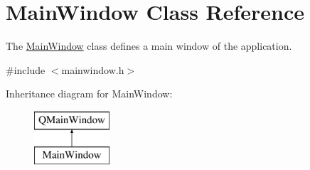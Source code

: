 \hypertarget{class_main_window}{\section{Main\-Window Class Reference}
\label{class_main_window}
}


The \hyperlink{class_main_window}{Main\-Window} class defines a main window of the application.  




{\ttfamily \#include $<$mainwindow.\-h$>$}

Inheritance diagram for Main\-Window\-:\begin{figure}[H]
\begin{center}
\leavevmode
\includegraphics[height=2.000000cm]{class_main_window}
\end{center}
\end{figure}
